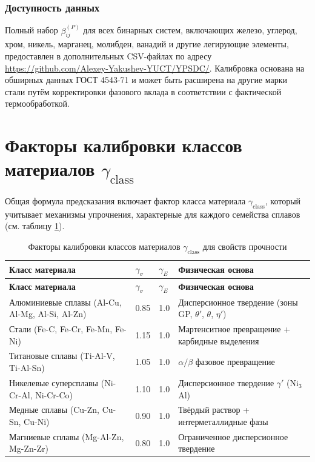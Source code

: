 \documentclass[12pt,a4paper]{article}
\begin{document}
	\subsubsection{Доступность данных}
	Полный набор $\beta_{ij}^{(P)}$ для всех бинарных систем, включающих железо, углерод, хром, никель, марганец, молибден, ванадий и другие легирующие элементы, предоставлен в дополнительных CSV-файлах по адресу \url{https://github.com/Alexey-Yakushev-YUCT/YPSDC/}. Калибровка основана на обширных данных ГОСТ 4543-71 и может быть расширена на другие марки стали путём корректировки фазового вклада в соответствии с фактической термообработкой.
	
	\section{Факторы калибровки классов материалов $\gamma_{\text{class}}$}
	Общая формула предсказания включает фактор класса материала $\gamma_{\text{class}}$, который учитывает механизмы упрочнения, характерные для каждого семейства сплавов (см. таблицу \ref{tab:gamma_class}).
	
	\begin{longtable}{p{3.5cm} p{2.5cm} p{2.5cm} p{5cm}}
		\caption{Факторы калибровки классов материалов $\gamma_{\text{class}}$ для свойств прочности}\label{tab:gamma_class}\\
		\toprule
		\textbf{Класс материала} & $\gamma_{\sigma}$ & $\gamma_{E}$ & \textbf{Физическая основа} \\
		\midrule
		\endfirsthead
		\toprule
		\textbf{Класс материала} & $\gamma_{\sigma}$ & $\gamma_{E}$ & \textbf{Физическая основа} \\
		\midrule
		\endhead
		Алюминиевые сплавы (Al-Cu, Al-Mg, Al-Si, Al-Zn) & 0.85 & 1.0 & Дисперсионное твердение (зоны GP, $\theta'$, $\theta$, $\eta'$) \\
		Стали (Fe-C, Fe-Cr, Fe-Mn, Fe-Ni) & 1.15 & 1.0 & Мартенситное превращение + карбидные выделения \\
		Титановые сплавы (Ti-Al-V, Ti-Al-Sn) & 1.05 & 1.0 & $\alpha/\beta$ фазовое превращение \\
		Никелевые суперсплавы (Ni-Cr-Al, Ni-Cr-Co) & 1.10 & 1.0 & Дисперсионное твердение $\gamma'$ (Ni$_3$Al) \\
		Медные сплавы (Cu-Zn, Cu-Sn, Cu-Ni) & 0.90 & 1.0 & Твёрдый раствор + интерметаллидные фазы \\
		Магниевые сплавы (Mg-Al-Zn, Mg-Zn-Zr) & 0.80 & 1.0 & Ограниченное дисперсионное твердение \\
		\bottomrule
	\end{longtable}
	
\end{document}
